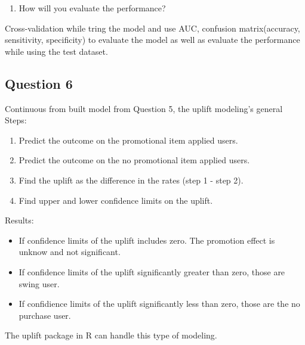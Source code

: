 \documentclass[]{article}
\providecommand{\tightlist}{%
  \setlength{\itemsep}{0pt}\setlength{\parskip}{0pt}}
\begin{document}
\begin{enumerate}
\def\labelenumi{\arabic{enumi}.}
\setcounter{enumi}{5}
\tightlist
\item
  How will you evaluate the performance?
\end{enumerate}

Cross-validation while tring the model and use AUC, confusion
matrix(accuracy, sensitivity, specificity) to evaluate the model as well
as evaluate the performance while using the test dataset.

\subsection{Question 6}\label{question-6}

Continuous from built model from Question 5, the uplift modeling's
general Steps:

\begin{enumerate}
\def\labelenumi{\arabic{enumi}.}
\tightlist
\item
  Predict the outcome on the promotional item applied users.
\item
  Predict the outcome on the no promotional item applied users.
\item
  Find the uplift as the difference in the rates (step 1 - step 2).
\item
  Find upper and lower confidence limits on the uplift.
\end{enumerate}

Results:

\begin{itemize}
\tightlist
\item
  If confidence limits of the uplift includes zero. The promotion effect
  is unknow and not significant.
\item
  If confidence limits of the uplift significantly greater than zero,
  those are swing user.
\item
  If confidience limits of the uplift significantly less than zero,
  those are the no purchase user.
\end{itemize}

The uplift package in R can handle this type of modeling.
\end{document}
